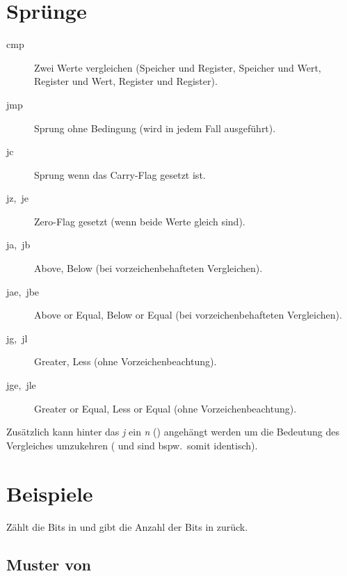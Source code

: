 \section{Sprünge}
\begin{description}
  \item [{cmp}]      Zwei Werte vergleichen (Speicher und Register, Speicher und Wert, Register und Wert, Register und Register).
  \item [{jmp}]      Sprung ohne Bedingung (wird in jedem Fall ausgeführt).
  \item [{jc}]       Sprung wenn das \foreignlanguage{english}{Carry-Flag} gesetzt ist.
  \item [{jz,~je}]   \foreignlanguage{english}{Zero-Flag} gesetzt (wenn beide Werte gleich sind).
  \item [{ja,~jb}]   \foreignlanguage{english}{Above, Below} (bei vorzeichenbehafteten Vergleichen).
  \item [{jae,~jbe}] \foreignlanguage{english}{Above or Equal, Below or Equal} (bei vorzeichenbehafteten Vergleichen).
  \item [{jg,~jl}]   \foreignlanguage{english}{Greater, Less} (ohne Vorzeichenbeachtung).
  \item [{jge,~jle}] \foreignlanguage{english}{Greater or Equal, Less or Equal} (ohne Vorzeichenbeachtung).
\end{description}
Zusätzlich kann hinter das \emph{j} ein \emph{n} () angehängt werden um die Bedeutung des Vergleiches umzukehren ( und  sind bspw.~somit identisch).


\section{Beispiele}

Zählt die Bits in  und gibt die Anzahl der Bits in  zurück.

\vfill{}


\subsection{Muster von }

